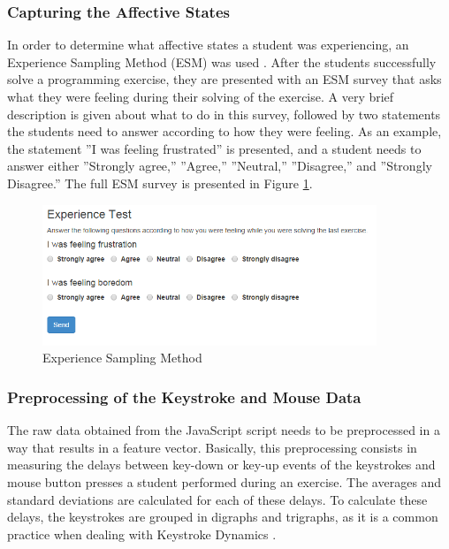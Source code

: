 \documentclass[runningheads,a4paper]{llncs}
\begin{document}
\subsubsection{Capturing the Affective States}

In order to determine what affective states a student was experiencing, an Experience Sampling Method (ESM) was used \cite{esm}. After the students successfully solve a programming exercise, they are presented with an ESM survey that asks what they were feeling during their solving of the exercise. A very brief description is given about what to do in this survey, followed by two statements the students need to answer according to how they were feeling. As an example, the statement ''I was feeling frustrated'' is presented, and a student needs to answer either ''Strongly agree,'' ''Agree,'' ''Neutral,'' ''Disagree,'' and ''Strongly Disagree.'' The full ESM survey is presented in Figure \ref{esm-survey}.

\begin{figure}[htp]
  \centerline{\includegraphics[width=10cm]{esm.png}}
  \label{esm-survey}
  \caption{Experience Sampling Method}
\end{figure}

\FloatBarrier

\subsubsection{Preprocessing of the Keystroke and Mouse Data}

The raw data obtained from the JavaScript script needs to be preprocessed in a way that results in a feature vector. Basically, this preprocessing consists in measuring the delays between key-down or key-up events of the keystrokes and mouse button presses a student performed during an exercise. The averages and standard deviations are calculated for each of these delays. To calculate these delays, the keystrokes are grouped in digraphs and trigraphs, as it is a common practice when dealing with Keystroke Dynamics \cite{digraph-trigraph}.
\end{document}
